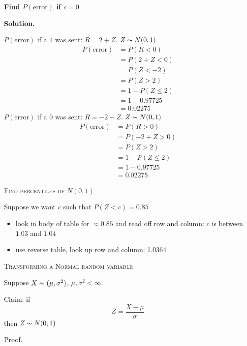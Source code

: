 \textbf{Find $P(\text{error})$ if $ c=0 $}

\textbf{Solution.}

$ P(\text{error}) $ if a $ 1 $ was sent: $ R =2+Z $. $ Z \thicksim N(0,1) $
\begin{align*}
    P(\text{error}) & =P(R<0)      \\
                    & =P(2+Z<0)    \\
                    & =P(Z<-2)     \\
                    & =P(Z>2)      \\
                    & =1-P(Z\le 2) \\
                    & =1-0.97725   \\
                    & =0.02275
\end{align*}
$ P(\text{error}) $ if a $ 0 $ was sent: $ R=-2+Z $. $ Z \thicksim N(0,1) $
\begin{align*}
    P(\text{error}) & =P(R>0)      \\
                    & =P(-2+Z>0)   \\
                    & =P(Z>2)      \\
                    & =1-P(Z\le 2) \\
                    & =1-0.97725   \\
                    & =0.02275
\end{align*}

\textsc{Find percentiles of $ N(0,1) $}

Suppose we want $ c $ such that $ P(Z<c)=0.85 $
\begin{itemize}
    \item look in body of table for $ \approx 0.85 $ and read off row and column: $ c $ is between $ 1.03 $ and $ 1.04 $
    \item use reverse table, look up row and column: 1.0364
\end{itemize}

\textsc{Transforming a Normal random variable}

Suppose $ X \thicksim (\mu,\sigma^2) $, $ \mu,\sigma^2<\infty $.

Claim: if
\[ Z=\frac{X-\mu}{\sigma}  \]
then $ Z \thicksim N(0,1) $

Proof.

